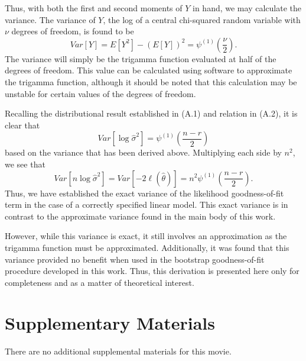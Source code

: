 \documentclass[12pt]{article} %
\theoremstyle{definition}
\begin{document}
Thus, with both the first and second moments of $Y$ in hand, we may calculate the variance. The variance of $Y$, the log of a central chi-squared random variable with
$\nu$ degrees of freedom, is found to be
\begin{equation*}
	Var \left[ Y \right ] = E \left[ Y^2 \right] - \left( E \left[ Y \right] \right)^2 = \psi^{(1)} \left( \frac{\nu}{2} \right) .
\end{equation*}
The variance will simply be the trigamma function evaluated at half of the degrees of freedom. This value can be calculated using software to approximate the trigamma function,
although it should be noted that this calculation may be unstable for certain values of the degrees of freedom.

Recalling the distributional result established in (A.1) and relation in (A.2), it is clear that
\begin{equation*}
	Var \left[ \log \hat{\sigma}^2 \right] = \psi^{(1)} \left( \frac{n-r}{2} \right)
\end{equation*}
based on the variance that has been derived above. Multiplying each side by $n^2$, we see that
\begin{equation*}
	Var \left[ n \log \hat{\sigma}^2 \right] = Var \left[ -2 \ell (\hat{\theta} ) \right] = n^2 \psi^{(1)} \left( \frac{n-r}{2} \right).
\end{equation*}
Thus, we have established the exact variance of the likelihood goodness-of-fit term in the case of a correctly specified linear model. This exact variance is in contrast to the
approximate variance found in the main body of this work.

However, while this variance is exact, it still involves an approximation as the trigamma function must be approximated. Additionally, it was found that
this variance provided no benefit when used in the bootstrap goodness-of-fit procedure developed in this work. Thus, this derivation is presented here only
for completeness and as a matter of theoretical interest.

\section*{Supplementary Materials}

There are no additional supplemental materials for this movie.
\par
\end{document}
